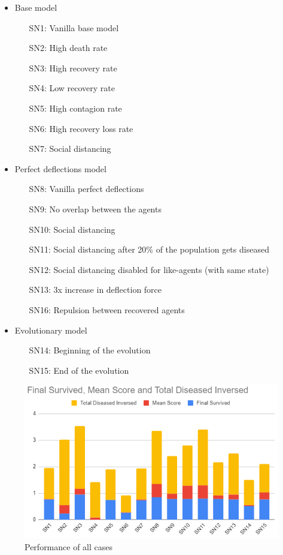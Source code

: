 \documentclass[a4paper,11pt]{article}
\begin{document}
    \begin{itemize}

        \item Base model
        \begin{itemize}
            \item[SN1:] Vanilla base model
            \item[SN2:] High death rate
            \item[SN3:] High recovery rate
            \item[SN4:] Low recovery rate
            \item[SN5:] High contagion rate
            \item[SN6:] High recovery loss rate
            \item[SN7:] Social distancing
        \end{itemize}

        \item Perfect deflections model
        \begin{itemize}
            \item[SN8:] Vanilla perfect deflections
            \item[SN9:] No overlap between the agents
            \item[SN10:] Social distancing
            \item[SN11:] Social distancing after 20\% of the population gets diseased
            \item[SN12:] Social distancing disabled for like-agents (with same state)
            \item[SN13:] 3x increase in deflection force
            \item[SN16:] Repulsion between recovered agents
        \end{itemize}

        \item Evolutionary model
        \begin{itemize}
            \item[SN14:] Beginning of the evolution
            \item[SN15:] End of the evolution
        \end{itemize}

    \end{itemize}

    \begin{figure}[ht]
        \centering
        \includegraphics[width=0.5\linewidth]{diagrams/All_SNs.png}
        \caption{Performance of all cases}
        \label{fig:4.1}
    \end{figure}
\end{document}
